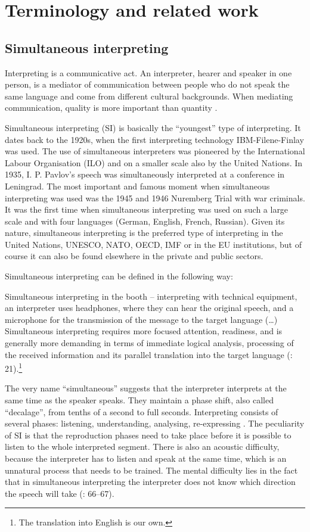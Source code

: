 \documentclass[output=paper]{langscibook}
\begin{document}
\section{Terminology and related work} \label{sec:kloudova:2}

\subsection{Simultaneous interpreting} \label{sec:kloudova:2.1}

Interpreting is a communicative act. An interpreter, hearer and speaker in one person, is a mediator of communication between people who do not speak the same language and come from different cultural backgrounds. When mediating communication, quality is more important than quantity \citep{Kopczyński1980}.

Simultaneous interpreting (SI) is basically the “youngest” type of interpreting. It dates back to the 1920s, when the first interpreting technology IBM-Filene-Finlay was used. The use of simultaneous interpreters was pioneered by the International Labour Organisation (ILO) and on a smaller scale also by the United Nations.  {In 1935}, I. P. Pavlov’s speech was simultaneously interpreted at a conference in Leningrad. The most important and famous moment when simultaneous interpreting was used was the 1945 and 1946 Nuremberg Trial with war criminals. It was the first time when simultaneous interpreting was used on such a large scale and with four languages (German, English, French, Russian). Given its nature, simultaneous interpreting is the preferred type of interpreting in the United Nations, UNESCO, NATO, OECD, IMF or in the EU institutions, but of course it can also be found elsewhere in the private and public sectors.

Simultaneous interpreting can be defined in the following way:

Simultaneous interpreting in the booth – interpreting with technical equipment, an interpreter uses headphones, where they can hear the original speech, and a microphone for the transmission of the message to the target language (…) Simultaneous interpreting requires more focused attention, readiness, and is generally more demanding in terms of immediate logical analysis, processing of the received information and its parallel translation into the target language (\citealt{Čeňková2008}: 21).\footnote{{The translation into English is our own.}}

The very name “simultaneous” suggests that the interpreter interprets at the same time as the speaker speaks. They maintain a phase shift, also called “decalage”, from tenths of a second to full seconds. Interpreting consists of several phases: listening, understanding, analysing, re-expressing \citep[6]{Jones1998}. The peculiarity of SI is that the reproduction phases need to take place before it is possible to listen to the whole interpreted segment. There is also an acoustic difficulty, because the interpreter has to listen and speak at the same time, which is an unnatural process that needs to be trained. The mental difficulty lies in the fact that in simultaneous interpreting the interpreter does not know which direction the speech will take (\citealt{Jones2002}: 66–67).
\end{document}
